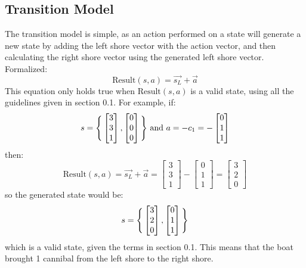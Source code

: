 \documentclass[11pt]{article}
\begin{document}
\subsection{Transition Model}
The transition model is simple, as an action performed on a state will generate a new state by adding the left  shore vector with the action vector, and then calculating the right shore vector using the generated left shore vector. Formalized:
\begin{equation}
\text{Result}(s,a) = \vec{s_L}+\vec{a}
\end{equation}
This equation only holds true when \(\text{Result}(s,a)\) is a valid state, using all the guidelines given in section 0.1. For example, if:
\begin{equation}
s= 
\Bigg{\{}
\begin{bmatrix}
3\\
3\\
1
\end{bmatrix},
\begin{bmatrix}
0\\
0\\
0
\end{bmatrix}
\Bigg{\}}
\text{ and } a=-c_1=-
\begin{bmatrix}
0\\
1\\
1\\
\end{bmatrix}
\end{equation} 
then:
\begin{equation}
\text{Result}(s,a)=\vec{s_L}+\vec{a}=
\begin{bmatrix}
3\\3\\1
\end{bmatrix}
-
\begin{bmatrix}
0\\1\\1
\end{bmatrix}
=
\begin{bmatrix}
3\\2\\0
\end{bmatrix}
\end{equation}
so the generated state would be:
\begin{equation}
s= 
\Bigg{\{}
\begin{bmatrix}
3\\
2\\
0
\end{bmatrix},
\begin{bmatrix}
0\\
1\\
1
\end{bmatrix}
\Bigg{\}}
\end{equation}
which is a valid state, given the terms in section 0.1. This means that the boat brought 1 cannibal from the left shore to the right shore.
\end{document}
